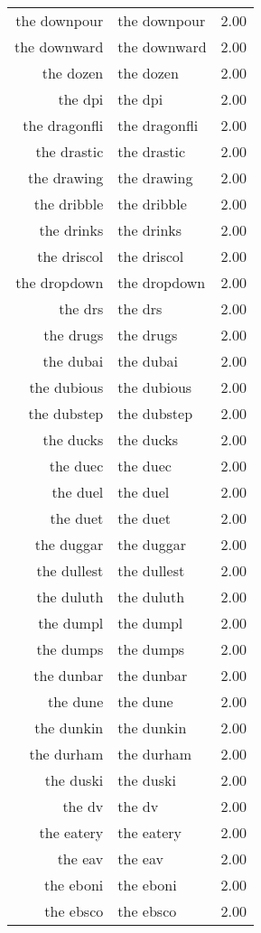 \begin{table}[ht]
\begin{tabular}{rlr}
  the downpour & the downpour & 2.00 \\ 
  the downward & the downward & 2.00 \\ 
  the dozen & the dozen & 2.00 \\ 
  the dpi & the dpi & 2.00 \\ 
  the dragonfli & the dragonfli & 2.00 \\ 
  the drastic & the drastic & 2.00 \\ 
  the drawing & the drawing & 2.00 \\ 
  the dribble & the dribble & 2.00 \\ 
  the drinks & the drinks & 2.00 \\ 
  the driscol & the driscol & 2.00 \\ 
  the dropdown & the dropdown & 2.00 \\ 
  the drs & the drs & 2.00 \\ 
  the drugs & the drugs & 2.00 \\ 
  the dubai & the dubai & 2.00 \\ 
  the dubious & the dubious & 2.00 \\ 
  the dubstep & the dubstep & 2.00 \\ 
  the ducks & the ducks & 2.00 \\ 
  the duec & the duec & 2.00 \\ 
  the duel & the duel & 2.00 \\ 
  the duet & the duet & 2.00 \\ 
  the duggar & the duggar & 2.00 \\ 
  the dullest & the dullest & 2.00 \\ 
  the duluth & the duluth & 2.00 \\ 
  the dumpl & the dumpl & 2.00 \\ 
  the dumps & the dumps & 2.00 \\ 
  the dunbar & the dunbar & 2.00 \\ 
  the dune & the dune & 2.00 \\ 
  the dunkin & the dunkin & 2.00 \\ 
  the durham & the durham & 2.00 \\ 
  the duski & the duski & 2.00 \\ 
  the dv & the dv & 2.00 \\ 
  the eatery & the eatery & 2.00 \\ 
  the eav & the eav & 2.00 \\ 
  the eboni & the eboni & 2.00 \\ 
  the ebsco & the ebsco & 2.00 \\ 

\end{tabular}
\end{table}
